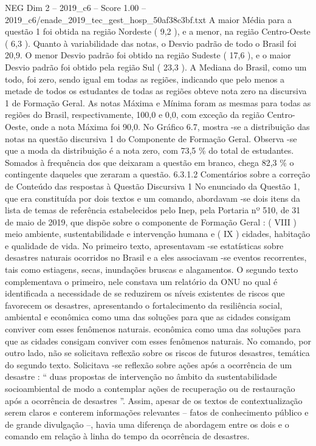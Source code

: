 \begin{textsample}{NEG Dim 2 – 2019\_c6 – Score 1.00 – 2019\_c6/enade\_2019\_tec\_gest\_hosp\_50af38c3bf.txt}
A maior Média para a questão 1 foi obtida na região Nordeste ( 9,2 ), e a menor, na região Centro-Oeste ( 6,3 ).
Quanto à variabilidade das notas, o Desvio padrão de todo o Brasil foi 20,9.
O menor Desvio padrão foi obtido na região Sudeste ( 17,6 ), e o maior Desvio padrão foi obtido pela região Sul ( 23,3 ).
A Mediana do Brasil, como um todo, foi zero, sendo igual em todas as regiões, indicando que pelo menos a metade de todos os estudantes de todas as regiões obteve nota zero na discursiva 1 de Formação Geral.
As notas Máxima e Mínima foram as mesmas para todas as regiões do Brasil, respectivamente, 100,0 e 0,0, com exceção da região Centro-Oeste, onde a nota Máxima foi 90,0.
No Gráfico 6.7, mostra -se a distribuição das notas na questão discursiva 1 do Componente de Formação Geral.
Observa -se que a moda da distribuição é a nota zero, com 73,5 \% do total de estudantes.
Somados à frequência dos que deixaram a questão em branco, chega 82,3 \% o contingente daqueles que zeraram a questão. 6.3.1.2 Comentários sobre a correção de Conteúdo das respostas à Questão Discursiva 1 No enunciado da Questão 1, que era constituída por dois textos e um comando, abordavam -se dois itens da lista de temas de referência estabelecidos pelo Inep, pela Portaria nº 510, de 31 de maio de 2019, que dispõe sobre o componente de Formação Geral : ( VIII ) meio ambiente, sustentabilidade e intervenção humana e ( IX ) cidades, habitação e qualidade de vida.
No primeiro texto, apresentavam -se estatísticas sobre desastres naturais ocorridos no Brasil e a eles associavam -se eventos recorrentes, tais como estiagens, secas, inundações bruscas e alagamentos.
O segundo texto complementava o primeiro, nele constava um relatório da ONU no qual é identificada a necessidade de se reduzirem os níveis existentes de riscos que favorecem os desastres, apresentando o fortalecimento da resiliência social, ambiental e econômica como uma das soluções para que as cidades consigam conviver com esses fenômenos naturais. econômica como uma das soluções para que as cidades consigam conviver com esses fenômenos naturais.
No comando, por outro lado, não se solicitava reflexão sobre os riscos de futuros desastres, temática do segundo texto.
Solicitava -se reflexão sobre ações após a ocorrência de um desastre : “ duas propostas de intervenção no âmbito da sustentabilidade socioambiental de modo a contemplar ações de recuperação ou de restauração após a ocorrência de desastres ”.
Assim, apesar de os textos de contextualização serem claros e conterem informações relevantes – fatos de conhecimento público e de grande divulgação –, havia uma diferença de abordagem entre os dois e o comando em relação à linha do tempo da ocorrência de desastres.

\end{textsample}
